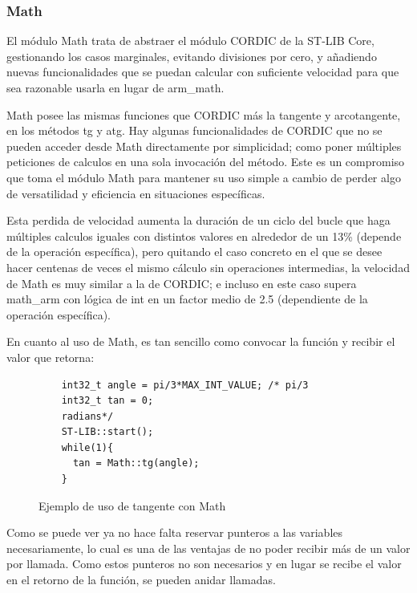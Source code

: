 \documentclass{report}
\begin{document}
\subsubsection{Math}
El módulo Math trata de abstraer el módulo CORDIC de la ST-LIB Core, gestionando los casos marginales, evitando divisiones por cero, y añadiendo nuevas funcionalidades que se puedan calcular con suficiente velocidad para que sea razonable usarla en lugar de arm\_math. \par \vspace{0.3cm}
Math posee las mismas funciones que CORDIC más la tangente y arcotangente, en los métodos tg y atg. Hay algunas funcionalidades de CORDIC que no se pueden acceder desde Math directamente por simplicidad; como poner múltiples peticiones de calculos en una sola invocación del método. Este es un compromiso que toma el módulo Math para mantener su uso simple a cambio de perder algo de versatilidad y eficiencia en situaciones específicas. \par \vspace{0.3cm}
Esta perdida de velocidad aumenta la duración de un ciclo del bucle que haga múltiples calculos iguales con distintos valores en alrededor de un 13\% (depende de la operación específica), pero quitando el caso concreto en el que se desee hacer centenas de veces el mismo cálculo sin operaciones intermedias, la velocidad de Math es muy similar a la de CORDIC; e incluso en este caso supera math\_arm con lógica de int en un factor medio de 2.5 (dependiente de la operación específica).
\par \vspace{0.3cm}
En cuanto al uso de Math, es tan sencillo como convocar la función y recibir el valor que retorna: 
\begin{figure}[h]
  \begin{lstlisting}
    int32_t angle = pi/3*MAX_INT_VALUE; /* pi/3 
    int32_t tan = 0;
    radians*/
    ST-LIB::start();
    while(1){
      tan = Math::tg(angle);
    }
  \end{lstlisting}
  \caption{Ejemplo de uso de tangente con Math}
  \label{MathCode}
\end{figure}
\par \vspace{0.3cm}
Como se puede ver ya no hace falta reservar punteros a las variables necesariamente, lo cual es una de las ventajas de no poder recibir más de un valor por llamada. Como estos punteros no son necesarios y en lugar se recibe el valor en el retorno de la función, se pueden anidar llamadas. 
\end{document}
